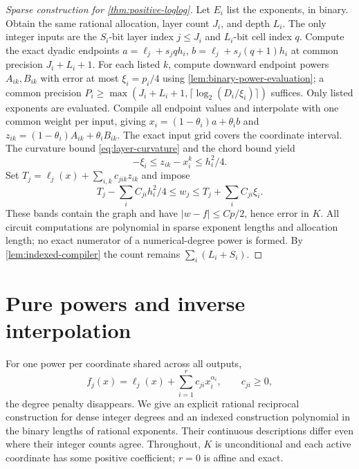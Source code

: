 \begin{proof}[Sparse construction for \cref{thm:positive-loglog}]
Let $E_i$ list the exponents, in binary. Obtain the same rational
allocation, layer count $J_i$, and depth $L_i$. The only integer inputs
are the $S_i$-bit layer index $j\le J_i$ and $L_i$-bit cell index $q$.
Compute the exact dyadic endpoints
$a=\ell_j+s_jqh_i$, $b=\ell_j+s_j(q+1)h_i$ at common precision
$J_i+L_i+1$. For each listed $k$, compute downward endpoint powers
$A_{ik},B_{ik}$ with error at most $\xi_i=p_i/4$ using
\cref{lem:binary-power-evaluation}; a common precision
$P_i\ge\max(J_i+L_i+1,\lceil\log_2(D_i/\xi_i)\rceil)$ suffices.
Only listed exponents are evaluated. Compile all endpoint values and
interpolate with one common weight per input, giving
$x_i=(1-\theta_i)a+\theta_i b$ and
$z_{ik}=(1-\theta_i)A_{ik}+\theta_i B_{ik}$.
The exact input grid covers the coordinate interval. The curvature
bound \eqref{eq:layer-curvature} and the chord bound yield
\[
 -\xi_i\le z_{ik}-x_i^k\le h_i^2/4.
\]
Set $T_j=\ell_j(x)+\sum_{i,k}c_{jik}z_{ik}$ and impose
\begin{equation}\label{eq:sparse-polynomial-band}
 T_j-\sum_iC_{ji}h_i^2/4\le w_j
 \le T_j+\sum_iC_{ji}\xi_i.
\end{equation}
These bands contain the graph and have
$|w-f|\le Cp/2$, hence error in $K$. All circuit computations are
polynomial in sparse exponent lengths and allocation length; no exact
numerator of a numerical-degree power is formed. By
\cref{lem:indexed-compiler} the count remains $\sum_i(L_i+S_i)$.
\end{proof}

\section{Pure powers and inverse interpolation}\label{sec:pure-powers}

For one power per coordinate shared across all outputs,
\begin{equation}\label{eq:pure-power-system}
 f_j(x)=\ell_j(x)+\sum_{i=1}^r c_{ji}x_i^{\alpha_i},
 \qquad c_{ji}\ge0,
\end{equation}
the degree penalty disappears. We give an explicit rational reciprocal
construction for dense integer degrees and an indexed construction
polynomial in the binary lengths of rational exponents. Their
continuous descriptions differ even where their integer counts agree.
Throughout, $K$ is unconditional and each active coordinate has some
positive coefficient; $r=0$ is affine and exact.

